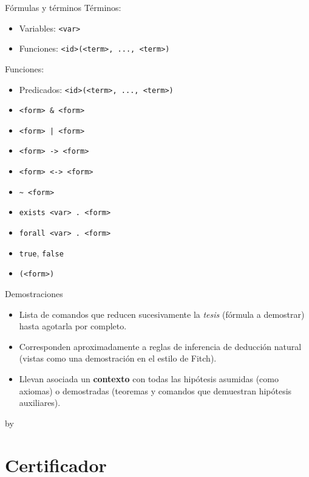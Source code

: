 \documentclass[xcolor={dvipsnames},spanish]{beamer}
\begin{document}
\begin{frame}[fragile]{Fórmulas y términos}
    Términos:
    \begin{itemize}
        \item Variables: \lstinline{<var>}
        \item Funciones: \lstinline{<id>(<term>, ..., <term>)}
    \end{itemize}

    Funciones:
    \begin{itemize}
        \item Predicados: \lstinline{<id>(<term>, ..., <term>)}
        \item \lstinline{<form> & <form>}
        \item \lstinline{<form> | <form>}
        \item \lstinline{<form> -> <form>}
        \item \lstinline{<form> <-> <form>}
        \item \lstinline{~ <form>}
        \item \lstinline{exists <var> . <form>}
        \item \lstinline{forall <var> . <form>}
        \item \lstinline{true}, \lstinline{false}
        \item \lstinline{(<form>)}
    \end{itemize}
\end{frame}

\begin{frame}{Demostraciones}
    \begin{itemize}
        \item Lista de comandos que reducen sucesivamente la \textit{tesis}
        (fórmula a demostrar) hasta agotarla por completo.
        \item Corresponden aproximadamente a reglas de inferencia de deducción
        natural (vistas como una demostración en el estilo de Fitch).
        \item Llevan asociada un \textbf{contexto} con todas las hipótesis
        asumidas (como axiomas) o demostradas (teoremas y comandos que
        demuestran hipótesis auxiliares).
    \end{itemize}
\end{frame}

\begin{frame}{by}
    
\end{frame}

\section{Certificador}
\end{document}
